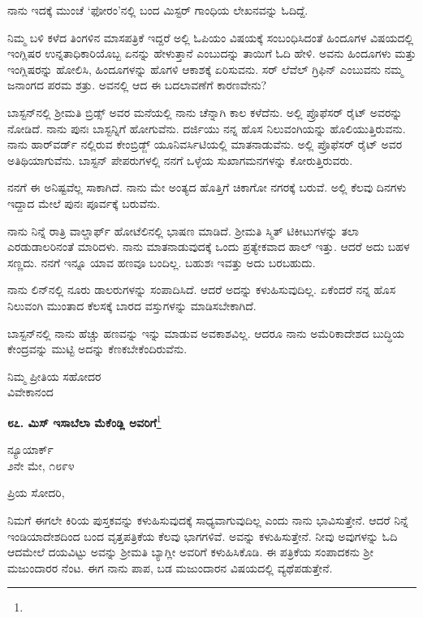 ನಾನು ಇದಕ್ಕೆ ಮುಂಚೆ `ಫೋರಂ'ನಲ್ಲಿ ಬಂದ ಮಿಸ್ಟರ್ ಗಾಂಧಿಯ ಲೇಖನವನ್ನು ಓದಿದ್ದೆ.

ನಿಮ್ಮ ಬಳಿ ಕಳೆದ ತಿಂಗಳಿನ  ಮಾಸಪತ್ರಿಕೆ ಇದ್ದರೆ ಅಲ್ಲಿ ಓಪಿಯಂ ವಿಷಯಕ್ಕೆ ಸಂಬಂಧಿಸಿದಂತೆ ಹಿಂದೂಗಳ ವಿಷಯದಲ್ಲಿ ಇಂಗ್ಲಿಷರ ಉನ್ನತಾಧಿಕಾರಿಯೊಬ್ಬ ಏನನ್ನು ಹೇಳುತ್ತಾನೆ ಎಂಬುದನ್ನು ತಾಯಿಗೆ ಓದಿ ಹೇಳಿ. ಅವನು ಹಿಂದೂಗಳು ಮತ್ತು ಇಂಗ್ಲಿಷರನ್ನು ಹೋಲಿಸಿ, ಹಿಂದೂಗಳನ್ನು ಹೊಗಳಿ ಆಕಾಶಕ್ಕೆ ಏರಿಸುವನು. ಸರ್‌ ಲೆವೆಲ್ ಗ್ರಿಫಿನ್ ಎಂಬುವನು ನಮ್ಮ ಜನಾಂಗದ ಪರಮ ಶತ್ರು. ಅವನಲ್ಲಿ ಆದ ಈ ಬದಲಾವಣೆಗೆ ಕಾರಣವೇನು?

ಬಾಸ್ಟನ್‌ನಲ್ಲಿ ಶ‍್ರೀಮತಿ ಬ್ರಿಡ್ಸ್ ಅವರ ಮನೆಯಲ್ಲಿ ನಾನು ಚೆನ್ನಾಗಿ ಕಾಲ ಕಳೆದೆನು. ಅಲ್ಲಿ ಪ್ರೊಫೆಸರ್ ರೈಟ್ ಅವರನ್ನು ನೋಡಿದೆ. ನಾನು ಪುನಃ ಬಾಸ್ಟನ್ನಿಗೆ ಹೋಗುವೆನು. ದರ್ಜಿಯು ನನ್ನ ಹೊಸ ನಿಲುವಂಗಿಯನ್ನು ಹೊಲಿಯುತ್ತಿರುವನು. ನಾನು ಹಾರ್‌ವರ್ಡ್‌ ನಲ್ಲಿರುವ ಕೇಂಬ್ರಿಡ್ಜ್ ಯೂನಿವರ್ಸಿಟಿಯಲ್ಲಿ ಮಾತನಾಡುವೆನು. ಅಲ್ಲಿ ಪ್ರೊಫೆಸರ್ ರೈಟ್ ಅವರ ಅತಿಥಿಯಾಗುವೆನು. ಬಾಸ್ಟನ್ ಪೇಪರುಗಳಲ್ಲಿ ನನಗೆ ಒಳ್ಳೆಯ ಸುಖಾಗಮನಗಳನ್ನು ಕೋರುತ್ತಿರುವರು.

ನನಗೆ ಈ ಅನಿಷ್ಟವೆಲ್ಲ ಸಾಕಾಗಿದೆ. ನಾನು ಮೇ ಅಂತ್ಯದ ಹೊತ್ತಿಗೆ ಚಿಕಾಗೋ ನಗರಕ್ಕೆ ಬರುವೆ. ಅಲ್ಲಿ ಕೆಲವು ದಿನಗಳು ಇದ್ದಾದ ಮೇಲೆ ಪುನಃ ಪೂರ್ವಕ್ಕೆ ಬರುವೆನು.

ನಾನು ನಿನ್ನೆ ರಾತ್ರಿ ವಾಲ್ಡಾರ್ಫ್ ಹೋಟೆಲಿನಲ್ಲಿ ಭಾಷಣ ಮಾಡಿದೆ. ಶ‍್ರೀಮತಿ ಸ್ಮಿತ್ ಟಿಕೀಟುಗಳನ್ನು ತಲಾ ಎರಡುಡಾಲರಿನಂತೆ ಮಾರಿದಳು. ನಾನು ಮಾತನಾಡುವುದಕ್ಕೆ ಒಂದು ಪ್ರತ್ಯೇಕವಾದ ಹಾಲ್ ಇತ್ತು. ಆದರೆ ಅದು ಬಹಳ ಸಣ್ಣದು. ನನಗೆ ಇನ್ನೂ ಯಾವ ಹಣವೂ ಬಂದಿಲ್ಲ. ಬಹುಶಃ ಇವತ್ತು ಅದು ಬರಬಹುದು.

ನಾನು ಲಿನ್‌ನಲ್ಲಿ ನೂರು ಡಾಲರುಗಳನ್ನು ಸಂಪಾದಿಸಿದೆ. ಆದರೆ ಅದನ್ನು ಕಳುಹಿಸುವುದಿಲ್ಲ. ಏಕೆಂದರೆ ನನ್ನ ಹೊಸ ನಿಲುವಂಗಿ ಮುಂತಾದ ಕೆಲಸಕ್ಕೆ ಬಾರದ ವಸ್ತುಗಳನ್ನು ಮಾಡಿಸಬೇಕಾಗಿದೆ.

ಬಾಸ್ಟನ್‌ನಲ್ಲಿ ನಾನು ಹೆಚ್ಚು ಹಣವನ್ನು ಇನ್ನು ಮಾಡುವ ಅವಕಾಶವಿಲ್ಲ. ಆದರೂ ನಾನು ಅಮೆರಿಕಾದೇಶದ ಬುದ್ಧಿಯ ಕೇಂದ್ರವನ್ನು ಮುಟ್ಟಿ ಅದನ್ನು ಕೆಣಕಬೇಕೆಂದಿರುವೆನು.

{\flushright
ನಿಮ್ಮ ಪ್ರೀತಿಯ ಸಹೋದರ\\ವಿವೇಕಾನಂದ\par}

\begin{center}
\textbf{೮೭. ಮಿಸ್ ಇಸಾಬೆಲಾ ಮೆಕೆಂಡ್ಲಿ ಅವರಿಗೆ}\footnote{}
\end{center}

\begin{flushright}
ನ್ಯೂಯಾರ್ಕ್\\೨ನೇ ಮೇ, ೧೮೯೪
\end{flushright}

\noindent
ಪ್ರಿಯ ಸೋದರಿ,

ನಿಮಗೆ ಈಗಲೇ ಕಿರಿಯ ಪುಸ್ತಕವನ್ನು ಕಳುಹಿಸುವುದಕ್ಕೆ ಸಾಧ್ಯವಾಗುವುದಿಲ್ಲ ಎಂದು ನಾನು ಭಾವಿಸುತ್ತೇನೆ. ಆದರೆ ನಿನ್ನೆ ಇಂಡಿಯಾದೇಶದಿಂದ ಬಂದ ವೃತ್ತಪತ್ರಿಕೆಯ ಕೆಲವು ಭಾಗಗಳಿವೆ. ಅವನ್ನು ಕಳುಹಿಸುತ್ತೇನೆ. ನೀವು ಅವುಗಳನ್ನು ಓದಿ ಆದಮೇಲೆ ದಯವಿಟ್ಟು ಅವನ್ನು ಶ‍್ರೀಮತಿ ಬ್ಯಾಗ್ಲೀ ಅವರಿಗೆ ಕಳುಹಿಸಿಕೊಡಿ. ಈ ಪತ್ರಿಕೆಯ ಸಂಪಾದಕನು ಶ‍್ರೀ ಮಜುಂದಾರರ ನೆಂಟ. ಈಗ ನಾನು ಪಾಪ, ಬಡ ಮಜುಂದಾರನ ವಿಷಯದಲ್ಲಿ ವ್ಯಥೆಪಡುತ್ತೇನೆ.

